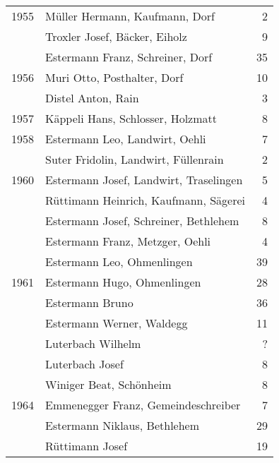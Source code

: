 {\begin{longtable}{ l l r }
        1955          & Müller Hermann, Kaufmann, Dorf            & 2           \\
                      & Troxler Josef, Bäcker, Eiholz             & 9           \\
                      & Estermann Franz, Schreiner, Dorf          & 35          \\
        1956          & Muri Otto, Posthalter, Dorf               & 10          \\
                      & Distel Anton, Rain                        & 3           \\
        1957          & Käppeli Hans, Schlosser, Holzmatt         & 8           \\
        1958          & Estermann Leo, Landwirt, Oehli            & 7           \\
                      & Suter Fridolin, Landwirt, Füllenrain      & 2           \\
        1960          & Estermann Josef, Landwirt, Traselingen    & 5           \\
                      & Rüttimann Heinrich, Kaufmann, Sägerei     & 4           \\
                      & Estermann Josef, Schreiner, Bethlehem     & 8           \\
                      & Estermann Franz, Metzger, Oehli           & 4           \\
                      & Estermann Leo, Ohmenlingen                & 39          \\
        1961          & Estermann Hugo, Ohmenlingen               & 28          \\
                      & Estermann Bruno                           & 36          \\
                      & Estermann Werner, Waldegg                 & 11          \\
                      & Luterbach Wilhelm                         & ?           \\
                      & Luterbach Josef                           & 8           \\
                      & Winiger Beat, Schönheim                   & 8           \\
        1964          & Emmenegger Franz, Gemeindeschreiber       & 7           \\
                      & Estermann Niklaus, Bethlehem              & 29          \\
                      & Rüttimann Josef                           & 19          \\

\end{longtable}}
